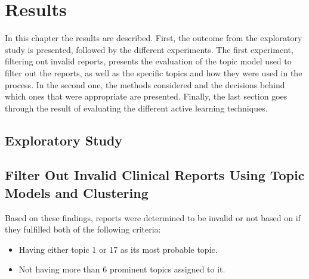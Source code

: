 \chapter{Results}
\label{cha:results}




In this chapter the results are described.
First, the outcome from the exploratory study is presented, followed by the different experiments.
The first experiment, filtering out invalid reports, presents the evaluation of the topic model used to filter out the reports, as well as the specific topics and how they were used in the process.
In the second one, the methods considered and the decisions behind which ones that were appropriate are presented.
Finally, the last section goes through the result of evaluating the different active learning techniques.

\section{Exploratory Study}


\section{Filter Out Invalid Clinical Reports Using Topic Models and Clustering}\label{sec:exp1-result}


Based on these findings, reports were determined to be invalid or not based on if they fulfilled both of the following criteria:
\begin{itemize}
    \item Having either topic 1 or 17 as its most probable topic.
    \item Not having more than 6 prominent topics assigned to it.
\end{itemize}

